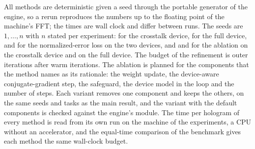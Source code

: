 All methods are deterministic given a seed through the portable generator of the engine, so a rerun reproduces the numbers up to the floating point of the machine's FFT; the times are wall clock and differ between runs. The seeds are $1,\dots,n$ with $n$ stated per experiment: \nSeedsOne{} for the crosstalk device, \nSeedsOneFull{} for the full device, \schroffXN{} and \schroffFN{} for the normalized-error loss on the two devices, and \ablBN{} and \ablBFN{}
for the ablation on the crosstalk device and on the full device. The budget of the refinement is \parOuter{} outer iterations after \parWarm{} warm iterations. The ablation is planned for the components that the method names as its rationale: the weight update, the device-aware conjugate-gradient step, the safeguard, the device model in the loop and the number of steps. Each variant removes one component and keeps the others, on the same seeds and tasks as the main result, and the variant with the default components is checked against the engine's module. The time per hologram of every method is read from its own run on the machine of the experiments, a CPU without an accelerator, and the equal-time comparison of the benchmark gives each method the same wall-clock budget.
